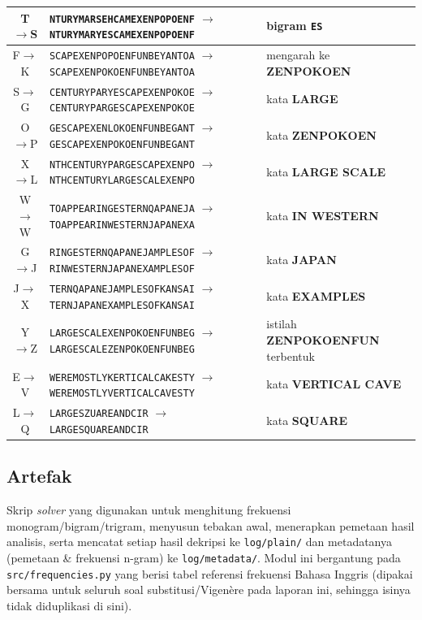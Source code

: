 \begin{enumerate}
\begin{center}
\begin{tabular}{|c|p{7.2cm}|p{5.3cm}|}
      \hline
      T$\to$S & \texttt{NTURYMARSEHCAMEXENPOPOENF} $\to$ \texttt{NTURYMARYESCAMEXENPOPOENF} & bigram \texttt{ES} \\
      \hline
      F$\to$K & \texttt{SCAPEXENPOPOENFUNBEYANTOA} $\to$ \texttt{SCAPEXENPOKOENFUNBEYANTOA} & mengarah ke \textbf{ZENPOKOEN} \\
      \hline
      S$\to$G & \texttt{CENTURYPARYESCAPEXENPOKOE} $\to$ \texttt{CENTURYPARGESCAPEXENPOKOE} & kata \textbf{LARGE} \\
      \hline
      O$\to$P & \texttt{GESCAPEXENLOKOENFUNBEGANT} $\to$ \texttt{GESCAPEXENPOKOENFUNBEGANT} & kata \textbf{ZENPOKOEN} \\
      \hline
      X$\to$L & \texttt{NTHCENTURYPARGESCAPEXENPO} $\to$ \texttt{NTHCENTURYLARGESCALEXENPO} & kata \textbf{LARGE SCALE} \\
      \hline
      W$\to$W & \texttt{TOAPPEARINGESTERNQAPANEJA} $\to$ \texttt{TOAPPEARINWESTERNJAPANEXA} & kata \textbf{IN WESTERN} \\
      \hline
      G$\to$J & \texttt{RINGESTERNQAPANEJAMPLESOF} $\to$ \texttt{RINWESTERNJAPANEXAMPLESOF} & kata \textbf{JAPAN} \\
      \hline
      J$\to$X & \texttt{TERNQAPANEJAMPLESOFKANSAI} $\to$ \texttt{TERNJAPANEXAMPLESOFKANSAI} & kata \textbf{EXAMPLES} \\
      \hline
      Y$\to$Z & \texttt{LARGESCALEXENPOKOENFUNBEG} $\to$ \texttt{LARGESCALEZENPOKOENFUNBEG} & istilah \textbf{ZENPOKOENFUN} terbentuk \\
      \hline
      E$\to$V & \texttt{WEREMOSTLYKERTICALCAKESTY} $\to$ \texttt{WEREMOSTLYVERTICALCAVESTY} & kata \textbf{VERTICAL CAVE} \\
      \hline
      L$\to$Q & \texttt{LARGESZUAREANDCIR} $\to$ \texttt{LARGESQUAREANDCIR} & kata \textbf{SQUARE} \\
      \hline
    \end{tabular}
  \end{center}
\end{enumerate}


\subsection*{Artefak}

Skrip \textit{solver} yang digunakan untuk menghitung frekuensi
monogram/bigram/trigram, menyusun tebakan awal, menerapkan pemetaan hasil
analisis, serta mencatat setiap hasil dekripsi ke \texttt{log/plain/} dan
metadatanya (pemetaan \& frekuensi n-gram) ke \texttt{log/metadata/}.
Modul ini bergantung pada \texttt{src/frequencies.py} yang berisi tabel
referensi frekuensi Bahasa Inggris (dipakai bersama untuk seluruh soal
substitusi/Vigen\`ere pada laporan ini, sehingga isinya tidak diduplikasi
di sini).

